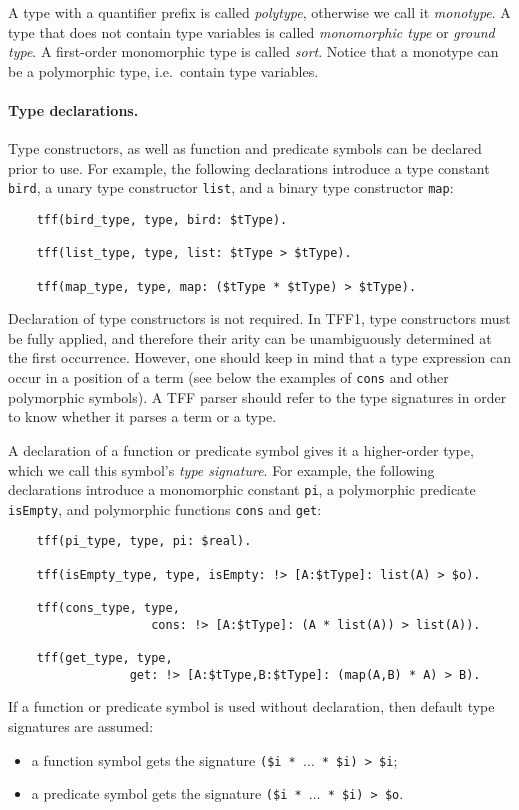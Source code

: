 A type with a quantifier prefix is called {\em polytype},
otherwise we call it {\em monotype}.
A type that does not contain type variables is called
{\em monomorphic type\/} or {\em ground type}.
A first-order monomorphic type is called {\em sort}. Notice
that a monotype can be a polymorphic type, i.e.~contain
type variables.

\paragraph{Type declarations.} Type constructors, as well as
function and predicate symbols can be declared prior to use.
For example, the following declarations introduce a type
constant {\tt bird}, a unary type constructor {\tt list},
and a binary type constructor {\tt map}:
\begin{verbatim}
    tff(bird_type, type, bird: $tType).

    tff(list_type, type, list: $tType > $tType).

    tff(map_type, type, map: ($tType * $tType) > $tType).
\end{verbatim}
Declaration of type constructors is not required. In TFF1,
type constructors must be fully applied, and therefore
their arity can be unambiguously determined at the first
occurrence. However, one should keep in mind that a type
expression can occur in a position of a term (see below
the examples of {\tt cons} and other polymorphic symbols).
A TFF parser should refer to the type signatures in order
to know whether it parses a term or a type.

A declaration of a function or predicate symbol gives it
a higher-order type, which we call this symbol's
{\em type signature}. For example, the following
declarations introduce a monomorphic constant {\tt pi},
a polymorphic predicate {\tt isEmpty}, and polymorphic
functions {\tt cons} and {\tt get}:
\begin{verbatim}
    tff(pi_type, type, pi: $real).

    tff(isEmpty_type, type, isEmpty: !> [A:$tType]: list(A) > $o).

    tff(cons_type, type,
                    cons: !> [A:$tType]: (A * list(A)) > list(A)).

    tff(get_type, type,
                 get: !> [A:$tType,B:$tType]: (map(A,B) * A) > B).
\end{verbatim}
If a function or predicate symbol is used without declaration,
then default type signatures are assumed:
\begin{itemize}
\item a function symbol gets the signature
{\tt (\$i * $\dots$ * \$i) > \$i};
\item a predicate symbol gets the signature
{\tt (\$i * $\dots$ * \$i) > \$o}.
\end{itemize}

